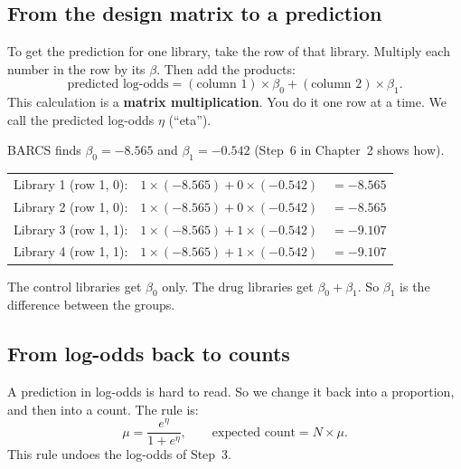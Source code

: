 \subsection{From the design matrix to a prediction}

To get the prediction for one library, take the row of that library. Multiply
each number in the row by its $\beta$. Then add the products:
\[
\text{predicted log-odds} = (\text{column 1}) \times \beta_0 +
(\text{column 2}) \times \beta_1 .
\]
This calculation is a \textbf{matrix multiplication}. You do it one row at
a time. We call the predicted log-odds $\eta$ (``eta'').

\begin{worked}
BARCS finds $\beta_0 = -8.565$ and $\beta_1 = -0.542$ (Step~6 in Chapter~2 shows how).

\begin{tabular}{@{}lll@{}}
Library 1 (row 1, 0): & $1 \times (-8.565) + 0 \times (-0.542)$ & $= -8.565$\\
Library 2 (row 1, 0): & $1 \times (-8.565) + 0 \times (-0.542)$ & $= -8.565$\\
Library 3 (row 1, 1): & $1 \times (-8.565) + 1 \times (-0.542)$ & $= -9.107$\\
Library 4 (row 1, 1): & $1 \times (-8.565) + 1 \times (-0.542)$ & $= -9.107$\\
\end{tabular}

\smallskip
The control libraries get $\beta_0$ only. The drug libraries get
$\beta_0 + \beta_1$. So $\beta_1$ is the difference between the groups.
\end{worked}

\subsection{From log-odds back to counts}

A prediction in log-odds is hard to read. So we change it back into a
proportion, and then into a count. The rule is:
\[
\mu = \frac{e^{\eta}}{1 + e^{\eta}}, \qquad
\text{expected count} = N \times \mu .
\]
This rule undoes the log-odds of Step~3.

